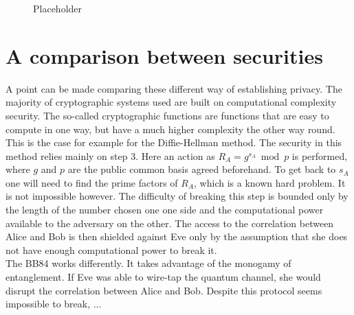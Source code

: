 		
		\begin{figure}[h!]
			\centering
			
			\caption{Placeholder}
			\label{Fig:OTP}
		\end{figure}
\section{A comparison between securities}
    A point can be made comparing these different way of establishing privacy.
    The majority of cryptographic systems used are built on computational complexity security. 
    The so-called cryptographic functions are functions that are easy to compute in one way, but have a much higher complexity the other way round.\\
    
    This is the case for example for the Diffie-Hellman method. 
	The security in this method relies mainly on step 3.    
    Here an action as $ R_A = g^{s_A} \bmod p $ is performed, where $g$ and $p$ are the public common basis agreed beforehand. 
	To get back to $s_A$  one will need to find the prime factors of $R_A$, which is a known hard problem. 
	It is not impossible however. 
	The difficulty of breaking this step is bounded only by the length of the number chosen one one side and the computational power available to the adversary on the other.
	The access to the correlation between Alice and Bob is then shielded against Eve only by the assumption that she does not have enough computational power to break it.\\
	
	The BB84 works differently. 
	It takes advantage of the monogamy of entanglement. 
	If Eve was able to wire-tap the quantum channel, she would disrupt the correlation between Alice and Bob.
	Despite this protocol seems impossible to break, ...
	
    
